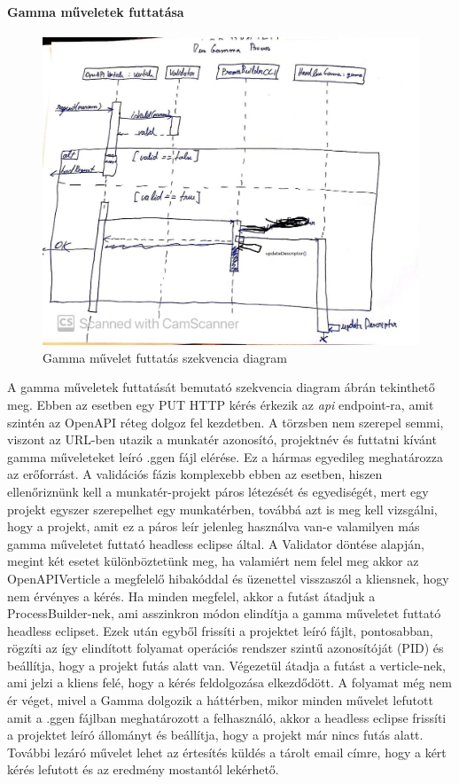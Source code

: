 \paragraph{Gamma műveletek futtatása}
\begin{figure}[!ht]
	\includegraphics[width=150mm, keepaspectratio]{figures/run_gamma_seq.jpg}
	\caption{Gamma művelet futtatás szekvencia diagram}
	\label{fig:rungamma}
\end{figure}
A gamma műveletek futtatását bemutató szekvencia diagram  ábrán tekinthető meg. Ebben az esetben egy PUT HTTP kérés érkezik az \textit{api} endpoint-ra, amit szintén az OpenAPI réteg dolgoz fel kezdetben. A törzsben nem szerepel semmi, viszont az URL-ben utazik a munkatér azonosító, projektnév és futtatni kívánt gamma műveleteket leíró .ggen fájl elérése. Ez a hármas egyedileg meghatározza az erőforrást. A validációs fázis komplexebb ebben az esetben, hiszen ellenőriznünk kell a munkatér-projekt páros létezését és egyediségét, mert egy projekt egyszer szerepelhet egy munkatérben, továbbá azt is meg kell vizsgálni, hogy a projekt, amit ez a páros leír jelenleg használva van-e valamilyen más gamma műveletet futtató headless eclipse által. A Validator döntése alapján, megint két esetet különböztetünk meg, ha valamiért nem felel meg akkor az OpenAPIVerticle a megfelelő hibakóddal és üzenettel visszaszól a kliensnek, hogy nem érvényes a kérés. Ha minden megfelel, akkor a futást átadjuk a ProcessBuilder-nek, ami asszinkron módon elindítja a gamma műveletet futtató headless eclipset. Ezek után egyből frissíti a projektet leíró fájlt, pontosabban, rögzíti az így elindított folyamat operációs rendszer szintű azonosítóját (PID) és beállítja, hogy a projekt futás alatt van. Végezetül átadja a futást a verticle-nek, ami jelzi a kliens felé, hogy a kérés feldolgozása elkezdődött.
A folyamat még nem ér véget, mivel a Gamma dolgozik a háttérben, mikor minden művelet lefutott amit a .ggen fájlban meghatározott a felhasználó, akkor a headless eclipse frissíti a projektet leíró állományt és beállítja, hogy a projekt már nincs futás alatt. További lezáró művelet lehet az értesítés küldés a tárolt email címre, hogy a kért kérés lefutott és az eredmény mostantól lekérhető.


